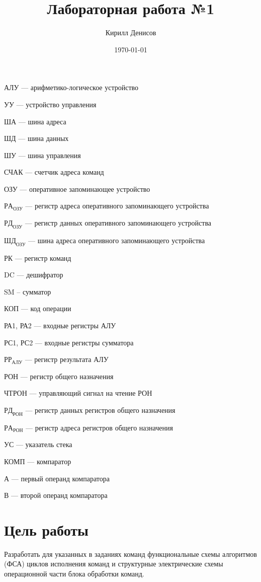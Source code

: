 \documentclass[a4paper,14pt]{extarticle}
\author{Кирилл Денисов}
\title{Лабораторная работа №1}
\date{\today}
\newcommand{\pathToCommonFolder}{/home/denilai/Documents/repos/latex/Common}
\begin{document}
%	
\setcounter{page}{2}



\section*{}
АЛУ --- арифметико-логическое устройство

УУ --- устройство управления

ША --- шина адреса

ШД --- шина данных

ШУ --- шина управления

СЧАК --- счетчик адреса команд

ОЗУ  --- оперативное запоминающее устройство

$РА_{ОЗУ}$ --- регистр адреса оперативного запоминающего устройства

$РД_{ОЗУ}$ --- регистр данных оперативного запоминающего устройства

$ШД_{ОЗУ}$ --- шина адреса оперативного запоминающего устройства

РК  --- регистр команд


DC  --- дешифратор

SM -- сумматор

КОП --- код операции

РА1, РА2 --- входные регистры АЛУ

РС1, РС2 --- входные регистры сумматора

$РР_{АЛУ}$ --- регистр результата АЛУ

РОН --- регистр общего назначения

ЧТРОН --- управляющий сигнал на чтение РОН

$РД_{РОН}$  --- регистр данных регистров общего назначения

$РА_{РОН}$  --- регистр адреса регистров общего назначения

УС --- указатель стека

КОМП --- компаратор

А --- первый операнд компаратора

В --- второй операнд компаратора

\newpage
	
	\section*{Цель работы}
	Разработать для указанных в заданиях команд функциональные схемы алгоритмов (ФСА) циклов исполнения команд и структурные электрические схемы операционной части блока обработки команд.
	
\end{document}
